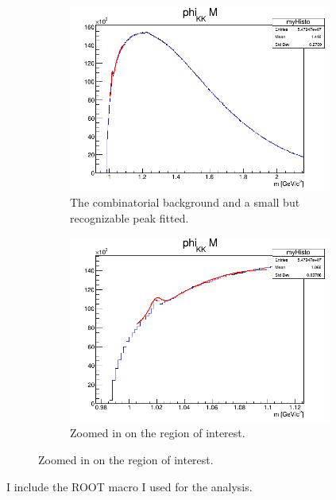 \documentclass[a4paper,12pt]{article}
\begin{document}
\begin{figure}[H]
	\centering
	\begin{subfigure}{0.49\textwidth}
		\centering
		\includegraphics[width=0.95\textwidth]{phi_KK_Mfit.png}
		\caption{ The combinatorial background and a small but recognizable peak fitted. }
	\end{subfigure}
	\begin{subfigure}{0.49\textwidth}
		\centering
		\includegraphics[width=0.95\textwidth]{phi_KK_Mfitzoom.png}
		\caption{ Zoomed in on the region of interest. }
	\end{subfigure}
\end{figure}
\par I include the ROOT macro I used for the analysis.

\end{document}

